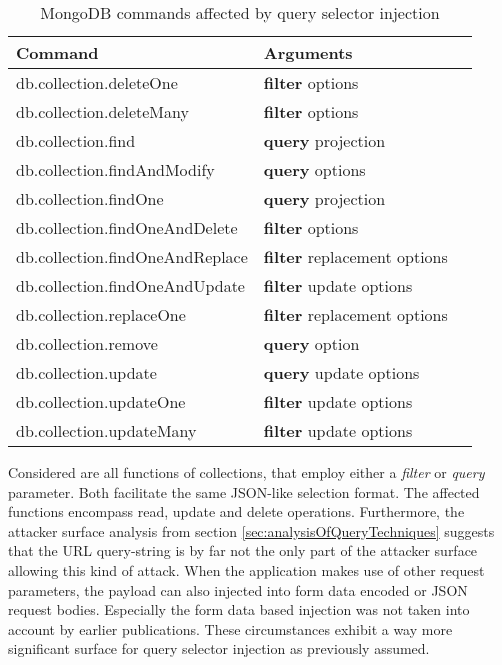 \begin{table}[h]
 \sffamily
 \centering
 \begin{tabular}{lll}
  \textbf{Command} & \textbf{Arguments} \\ \hline
  db.collection.deleteOne         & \textbf{filter} options \\
  db.collection.deleteMany        & \textbf{filter} options \\
  db.collection.find              & \textbf{query} projection \\
  db.collection.findAndModify     & \textbf{query} options \\
  db.collection.findOne           & \textbf{query} projection \\
  db.collection.findOneAndDelete  & \textbf{filter} options \\
  db.collection.findOneAndReplace & \textbf{filter} replacement options \\
  db.collection.findOneAndUpdate  & \textbf{filter} update options \\
  db.collection.replaceOne        & \textbf{filter} replacement options \\
  db.collection.remove            & \textbf{query} option \\
  db.collection.update            & \textbf{query} update options \\
  db.collection.updateOne         & \textbf{filter} update options \\
  db.collection.updateMany        & \textbf{filter} update options \\
  \bottomrule 
 \end{tabular}
 \caption{MongoDB commands affected by query selector injection}
 \label{tab:mongo_commands_affected}
\end{table}

Considered are all functions of collections, that employ either a \emph{filter} or \emph{query} parameter. Both facilitate the same JSON-like selection format. The affected functions encompass read, update and delete operations. Furthermore, the attacker surface analysis from section \ref{sec:analysisOfQueryTechniques} suggests that the URL query-string is by far not the only part of the attacker surface allowing this kind of attack. When the application makes use of other request parameters, the payload can also injected into form data encoded or JSON request bodies. Especially the form data based injection was not taken into account by earlier publications. These circumstances exhibit a way more significant surface for query selector injection as previously assumed. \\

